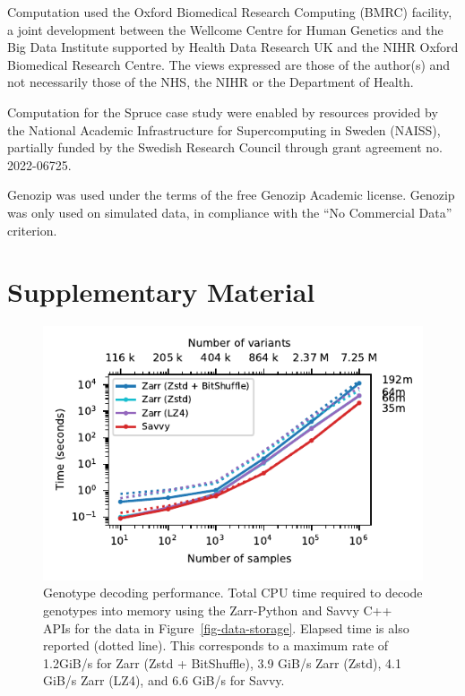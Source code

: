 \documentclass[a4paper,num-refs]{oup-contemporary}
\begin{document}
Computation used the Oxford Biomedical Research Computing (BMRC) facility, a
joint development between the Wellcome Centre for Human Genetics and the Big
Data Institute supported by Health Data Research UK and the NIHR Oxford
Biomedical Research Centre. The views expressed are those of the author(s) and
not necessarily those of the NHS, the NIHR or the Department of Health.

Computation for the Spruce case study were enabled by resources
provided by the National Academic Infrastructure for Supercomputing in
Sweden (NAISS), partially funded by the Swedish Research Council
through grant agreement no. 2022-06725.

Genozip was used under the terms of the free Genozip Academic license.
Genozip was only used on simulated data, in compliance with
the ``No Commercial Data'' criterion.



\renewcommand\thefigure{S\arabic{figure}}
\setcounter{figure}{0}
\renewcommand\thetable{S\arabic{table}}
\setcounter{table}{0}

\section*{Supplementary Material}

\begin{figure}[h]
\includegraphics{figures/whole-matrix-decode}
\caption{Genotype decoding performance.
Total CPU time required to decode genotypes into memory using the Zarr-Python
and Savvy C++ APIs for the data in Figure~\ref{fig-data-storage}.
Elapsed time is also reported (dotted line). 
This corresponds to a maximum rate of 1.2GiB/s for Zarr (Zstd + BitShuffle),
3.9 GiB/s Zarr (Zstd), 4.1 GiB/s Zarr (LZ4), and 6.6 GiB/s for Savvy. 
\label{fig-whole-matrix-decode}}
\end{figure}
\end{document}
